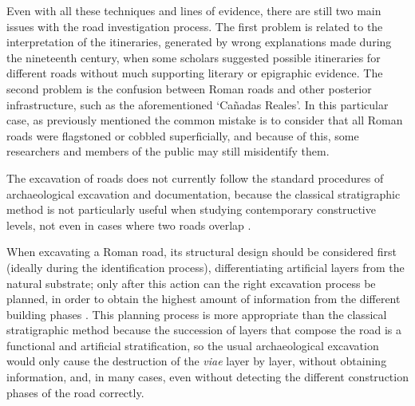 	Even with all these techniques and lines of evidence, there are still two main issues with the road investigation process. The first problem is related to the interpretation of the itineraries, generated by wrong explanations made during the nineteenth century, when some scholars suggested possible itineraries for different roads \parencite[47]{Beltrán_1990} without much supporting literary or epigraphic evidence. The second problem is the confusion between Roman roads and other posterior infrastructure, such as the aforementioned ‘Cañadas Reales’. In this particular case, as previously mentioned the common mistake is to consider that all Roman roads were flagstoned or cobbled superficially, and because of this, some researchers and members of the public may still misidentify them.
	
	
	The excavation of roads does not currently follow the standard procedures of archaeological excavation and documentation, because the classical stratigraphic method is not particularly useful when studying contemporary constructive levels, not even in cases where two roads overlap \parencite[36]{Moreno_2009}.
	
	When excavating a Roman road, its structural design should be considered first (ideally during the identification process), differentiating artificial layers from the natural substrate; only after this action can the right excavation process be planned, in order to obtain the highest amount of information from the different building phases \parencite[49]{Palomino_2010}. This planning process is more appropriate than the classical stratigraphic method because the succession of layers that compose the road is a functional and artificial stratification, so the usual archaeological excavation would only cause the destruction of the \textit{viae} layer by layer, without obtaining information, and, in many cases, even without detecting the different construction phases of the road correctly.
	
